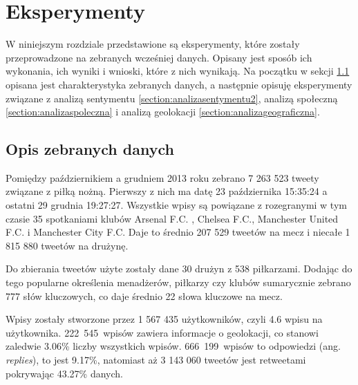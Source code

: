 \chapter{Eksperymenty}
\label{chapter:eksperymenty}
W niniejszym rozdziale przedstawione są eksperymenty, które zostały
przeprowadzone na zebranych wcześniej danych.
Opisany jest sposób ich wykonania, ich wyniki i wnioski, które z nich wynikają.
Na początku w sekcji \ref{section:opisdanych} opisana jest charakterystyka
zebranych danych, a następnie opisuję eksperymenty związane z analizą sentymentu
\ref{section:analizasentymentu2}, analizą społeczną 
\ref{section:analizaspoleczna} i analizą geolokacji 
\ref{section:analizageograficzna}.














\section{Opis zebranych danych}
\label{section:opisdanych}

Pomiędzy październikiem a grudniem 2013 roku zebrano 7 263 523 tweety związane
z piłką nożną. Pierwszy z nich ma datę 23 października 15:35:24 a ostatni
29 grudnia 19:27:27. Wszystkie wpisy są powiązane z rozegranymi w tym czasie
35 spotkaniami klubów Arsenal F.C. , Chelsea F.C., Manchester United F.C. i
Manchester City F.C. Daje to średnio 207 529 tweetów na mecz i niecałe
1 815 880 tweetów na drużynę.

Do zbierania tweetów użyte zostały dane 30 drużyn z 538 piłkarzami.
Dodając do tego popularne określenia menadżerów, piłkarzy czy klubów sumarycznie
zebrano 777 słów kluczowych, co daje średnio 22 słowa kluczowe na mecz.

Wpisy zostały stworzone przez 1 567 435 użytkowników, czyli 4.6 
wpisu na użytkownika. \mbox{222 545 wpisów} zawiera informacje o geolokacji, co 
stanowi zaledwie 3.06\% liczby wszystkich wpisów. \mbox{666 199 wpisów} to 
odpowiedzi (ang. \textit{replies}), to jest 9.17\%, natomiast aż 3 143 060 
tweetów jest retweetami pokrywając 43.27\% danych.

